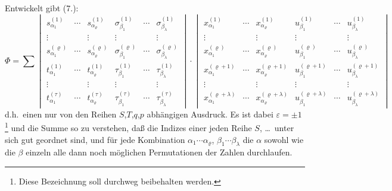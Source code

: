\documentclass[12pt,a4paper]{article}
\begin{document}
Entwickelt gibt (7.):
\begin{equation}\tag{8}
\Phi = \sum \begin{vmatrix} s^{(1)}_{\alpha_{1}} & \cdots & s^{(1)}_{\alpha_{\varrho}} & \sigma^{(1)}_{\beta_{1}} & \cdots & \sigma^{(1)}_{\beta_{\lambda}} \\ \vdots & & \vdots & \vdots & & \vdots \\ s^{(\varrho)}_{\alpha_{1}} & \cdots & s^{(\varrho)}_{\alpha_{\varrho}} & \sigma^{(\varrho)}_{\beta_{1}} & \cdots & \sigma^{(\varrho)}_{\beta_{\lambda}} \\ t^{(1)}_{\alpha_{1}} & \cdots & t^{(1)}_{\alpha_{\varrho}} & \tau^{(1)}_{\beta_{1}} & \cdots & \tau^{(1)}_{\beta_{\lambda}} \\ \vdots & & \vdots & \vdots & & \vdots \\ t^{(\tau)}_{\alpha_{1}} & \cdots & t^{(\tau)}_{\alpha_{\varrho}} & \tau^{(\tau)}_{\beta_{1}} & \cdots & \tau^{(\tau)}_{\beta_{\lambda}} \end{vmatrix} \cdot \begin{vmatrix} x^{(1)}_{\alpha_{1}} & \cdots & x^{(1)}_{\alpha_{\varrho}} & u^{(1)}_{\beta_{1}} & \cdots & u^{(1)}_{\beta_{\lambda}} \\ \vdots & & \vdots & \vdots & & \vdots \\ x^{(\varrho)}_{\alpha_{1}} & \cdots & x^{(\varrho)}_{\alpha_{\varrho}} & u^{(\varrho)}_{\beta_{1}} & \cdots & u^{(\varrho)}_{\beta_{\lambda}} \\ x^{(\varrho+1)}_{\alpha_{1}} & \cdots & x^{(\varrho+1)}_{\alpha_{\varrho}} & u^{(\varrho+1)}_{\beta_{1}} & \cdots & u^{(\varrho+1)}_{\beta_{\lambda}} \\ \vdots & & \vdots & \vdots & & \vdots \\ x^{(\varrho+\lambda)}_{\alpha_{1}} & \cdots & x^{(\varrho+\lambda)}_{\alpha_{\varrho}} & u^{(\varrho+\lambda)}_{\beta_{1}} & \cdots & u^{(\varrho+\lambda)}_{\beta_{\lambda}} \end{vmatrix}
\end{equation}
d.h.\ einen nur von den Reihen $S$,$T$,$q$,$p$ abhängigen Ausdruck. Es ist dabei $\varepsilon = \pm 1$\footnote{Diese Bezeichnung soll durchweg beibehalten werden.} und die Summe so zu verstehen, daß die Indizes einer jeden Reihe $S$, \ldots\ unter sich gut geordnet sind, und für jede Kombination $\alpha_{1} \cdots \alpha_{\varrho}$, $\beta_{1} \cdots \beta_{\lambda}$ die $\alpha$ sowohl wie die $\beta$ einzeln alle dann noch möglichen Permutationen der Zahlen durchlaufen.
\end{document}
